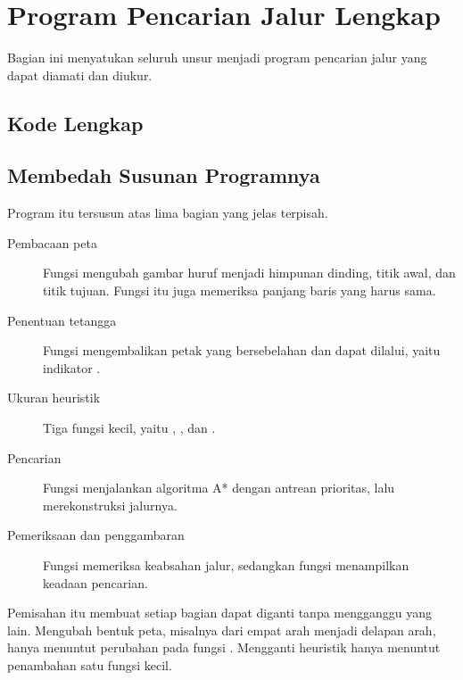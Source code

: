 \section{Program Pencarian Jalur Lengkap}
\label{sec:program-astar}

Bagian ini menyatukan seluruh unsur menjadi program pencarian jalur yang dapat
diamati dan diukur.

\subsection{Kode Lengkap}


\subsection{Membedah Susunan Programnya}

Program itu tersusun atas lima bagian yang jelas terpisah.

\begin{description}
  \item[Pembacaan peta] Fungsi  mengubah gambar huruf menjadi
        himpunan dinding, titik awal, dan titik tujuan. Fungsi itu juga
        memeriksa panjang baris yang harus sama.
  \item[Penentuan tetangga] Fungsi  mengembalikan petak yang
        bersebelahan dan dapat dilalui, yaitu indikator .
  \item[Ukuran heuristik] Tiga fungsi kecil, yaitu ,
        , dan .
  \item[Pencarian] Fungsi  menjalankan algoritma A* dengan
        antrean prioritas, lalu merekonstruksi jalurnya.
  \item[Pemeriksaan dan penggambaran] Fungsi  memeriksa
        keabsahan jalur, sedangkan fungsi  menampilkan
        keadaan pencarian.
\end{description}

Pemisahan itu membuat setiap bagian dapat diganti tanpa mengganggu yang lain.
Mengubah bentuk peta, misalnya dari empat arah menjadi delapan arah, hanya
menuntut perubahan pada fungsi . Mengganti heuristik hanya
menuntut penambahan satu fungsi kecil.


